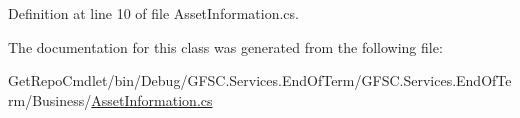 Definition at line 10 of file Asset\+Information.\+cs.



The documentation for this class was generated from the following file\+:\begin{DoxyCompactItemize}
\item 
Get\+Repo\+Cmdlet/bin/\+Debug/\+G\+F\+S\+C.\+Services.\+End\+Of\+Term/\+G\+F\+S\+C.\+Services.\+End\+Of\+Term/\+Business/\mbox{\hyperlink{_business_2_asset_information_8cs}{Asset\+Information.\+cs}}\end{DoxyCompactItemize}
